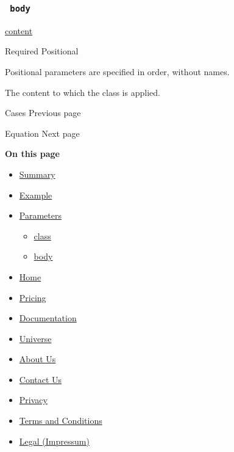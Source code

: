 \subsubsection{\texorpdfstring{\texttt{\ body\ }}{ body }}\label{parameters-body}

\href{/docs/reference/foundations/content/}{content}

{Required} {{ Positional }}

\label{parameters-body-positional-tooltip}
Positional parameters are specified in order, without names.

The content to which the class is applied.

\href{/docs/reference/math/cases/}{\pandocbounded{}}

{ Cases } { Previous page }

\href{/docs/reference/math/equation/}{\pandocbounded{}}

{ Equation } { Next page }

\textbf{On this page}

\begin{itemize}
\tightlist
\item
  \hyperref[summary]{Summary}
\item
  \hyperref[example]{Example}
\item
  \hyperref[parameters]{Parameters}

  \begin{itemize}
  \tightlist
  \item
    \hyperref[parameters-class]{class}
  \item
    \hyperref[parameters-body]{body}
  \end{itemize}
\end{itemize}

\begin{itemize}
\tightlist
\item
  \href{/}{Home}
\item
  \href{/pricing/}{Pricing}
\item
  \href{/docs/}{Documentation}
\item
  \href{/universe/}{Universe}
\item
  \href{/about/}{About Us}
\item
  \href{/contact/}{Contact Us}
\item
  \href{/privacy/}{Privacy}
\item
  \href{https://typst.app/terms}{Terms and Conditions}
\item
  \href{/legal/}{Legal (Impressum)}
\end{itemize}

